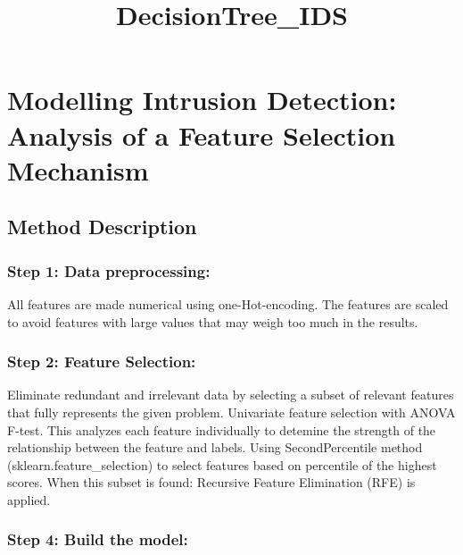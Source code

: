\documentclass[11pt]{article}
\title{DecisionTree\_IDS}
\begin{document}
    
    \maketitle
    
    

    
    \hypertarget{modelling-intrusion-detection-analysis-of-a-feature-selection-mechanism}{%
\section{Modelling Intrusion Detection: Analysis of a Feature Selection
Mechanism}\label{modelling-intrusion-detection-analysis-of-a-feature-selection-mechanism}}

\hypertarget{method-description}{%
\subsection{Method Description}\label{method-description}}

\hypertarget{step-1-data-preprocessing}{%
\subsubsection{Step 1: Data
preprocessing:}\label{step-1-data-preprocessing}}

All features are made numerical using one-Hot-encoding. The features are
scaled to avoid features with large values that may weigh too much in
the results.

\hypertarget{step-2-feature-selection}{%
\subsubsection{Step 2: Feature
Selection:}\label{step-2-feature-selection}}

Eliminate redundant and irrelevant data by selecting a subset of
relevant features that fully represents the given problem. Univariate
feature selection with ANOVA F-test. This analyzes each feature
individually to detemine the strength of the relationship between the
feature and labels. Using SecondPercentile method
(sklearn.feature\_selection) to select features based on percentile of
the highest scores. When this subset is found: Recursive Feature
Elimination (RFE) is applied.

\hypertarget{step-4-build-the-model}{%
\subsubsection{Step 4: Build the model:}\label{step-4-build-the-model}}
\end{document}

